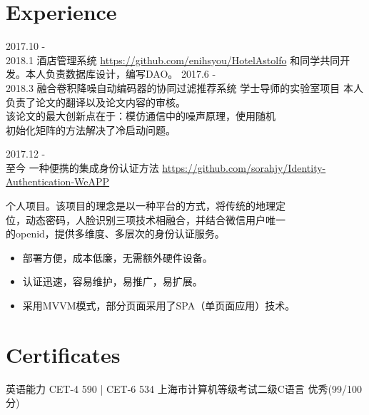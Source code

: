 \documentclass[letterpaper,UTF8]{twentysecondcv} %
\begin{document}


\section{Experience}

\begin{twenty} %
	\twentyitem
    	{2017.10 - \\2018.1}
        {酒店管理系统}
        {}
        {\href{https://github.com/sorahjy/HotelAstolfo}{https://github.com/enihsyou/HotelAstolfo}}
        {和同学共同开发。本人负责数据库设计，编写DAO。
        {%
        }}
    \twentyitem
    	{2017.6 - \\2018.3}
        {融合卷积降噪自动编码器的协同过滤推荐系统}
        {}
        {学士导师的实验室项目}
        {本人负责了论文的翻译以及论文内容的审核。\\
        该论文的最大创新点在于：模仿通信中的噪声原理，使用随机\\
        初始化矩阵的方法解决了冷启动问题。}
        
    \twentyitem
   		{2017.12 - \\ 至今}
        {一种便携的集成身份认证方法}
        {}
        {\href{https://github.com/sorahjy/Identity-Authentication-WeAPP}{https://github.com/sorahjy/Identity-Authentication-WeAPP}}
        {个人项目。该项目的理念是以一种平台的方式，将传统的地理定\\
        位，动态密码，人脸识别三项技术相融合，并结合微信用户唯一\\
        的openid，提供多维度、多层次的身份认证服务。
        {\begin{itemize}
        \item 部署方便，成本低廉，无需额外硬件设备。
        \item 认证迅速，容易维护，易推广，易扩展。
        \item 采用MVVM模式，部分页面采用了SPA（单页面应用）技术。
    \end{itemize}}
        }
\end{twenty}

\section{Certificates}
\begin{twenty}
    \twentyitem
        {}
        {英语能力 CET-4 590 | CET-6 534}
        {}
        {}
        {}
    \twentyitem
        {}
        {上海市计算机等级考试二级C语言 优秀(99/100分)}
        {}
        {}
        {}
\end{twenty}
\end{document}
